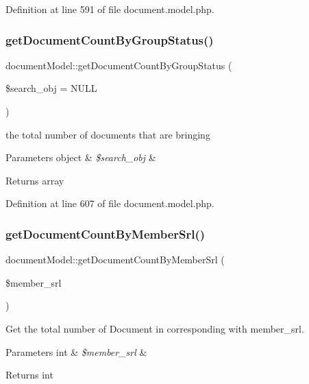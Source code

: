 Definition at line 591 of file document.\+model.\+php.

\hypertarget{classdocumentModel_a495a49acccae8f20257db40accdffb88}{}\label{classdocumentModel_a495a49acccae8f20257db40accdffb88} 
\subsubsection{\texorpdfstring{get\+Document\+Count\+By\+Group\+Status()}{getDocumentCountByGroupStatus()}}
{\footnotesize\ttfamily document\+Model\+::get\+Document\+Count\+By\+Group\+Status (\begin{DoxyParamCaption}\item[{}]{\$search\+\_\+obj = {\ttfamily NULL} }\end{DoxyParamCaption})}

the total number of documents that are bringing 
\begin{DoxyParams}[1]{Parameters}
object & {\em \$search\+\_\+obj} & \\
\hline
\end{DoxyParams}
\begin{DoxyReturn}{Returns}
array 
\end{DoxyReturn}


Definition at line 607 of file document.\+model.\+php.

\hypertarget{classdocumentModel_aef8741dec5f19c45c98d9d749974c82b}{}\label{classdocumentModel_aef8741dec5f19c45c98d9d749974c82b} 
\subsubsection{\texorpdfstring{get\+Document\+Count\+By\+Member\+Srl()}{getDocumentCountByMemberSrl()}}
{\footnotesize\ttfamily document\+Model\+::get\+Document\+Count\+By\+Member\+Srl (\begin{DoxyParamCaption}\item[{}]{\$member\+\_\+srl }\end{DoxyParamCaption})}

Get the total number of Document in corresponding with member\+\_\+srl. 
\begin{DoxyParams}[1]{Parameters}
int & {\em \$member\+\_\+srl} & \\
\hline
\end{DoxyParams}
\begin{DoxyReturn}{Returns}
int 
\end{DoxyReturn}


